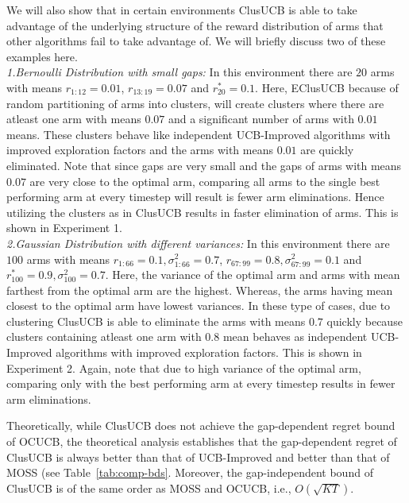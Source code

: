 We will also show that in certain environments ClusUCB is able to take advantage of the underlying structure of the reward distribution of arms that other algorithms fail to take advantage of. We will briefly discuss two of these examples here.
\\
\textit{1.Bernoulli Distribution with small gaps:} In this environment there are $20$ arms with means $r_{1:12}=0.01$, $r_{13:19}=0.07$ and $r_{20}^{*} =0.1$. Here, EClusUCB because of random partitioning of arms into clusters, will create clusters where there are atleast one arm with means $0.07$ and a significant number of arms with $0.01$ means. These clusters behave like independent UCB-Improved algorithms with improved exploration factors and the arms with means $0.01$ are quickly eliminated. Note that since gaps are very small and the gaps of arms with means $0.07$ are very close to the optimal arm, comparing all arms to the single best performing arm at every timestep will result is fewer arm eliminations. Hence utilizing the clusters as in ClusUCB results in faster elimination of arms. This is shown in Experiment 1.\\
\textit{2.Gaussian Distribution with different variances:} In this environment there are $100$ arms with means $r_{1:66}=0.1,\sigma_{1:66}^2 =0.7$, $r_{67:99}=0.8,\sigma_{67:99}^2 =0.1$ and $r_{100}^{*}=0.9, \sigma_{100}^2 =0.7$. Here, the variance of the optimal arm and arms with mean farthest from  the optimal arm are the highest. Whereas, the arms having mean closest to the optimal arm have lowest variances. In these type of cases, due to clustering ClusUCB is able to eliminate the arms with means $0.7$ quickly because clusters containing atleast one arm with $0.8$ mean behaves as independent UCB-Improved algorithms with improved exploration factors. This is shown in Experiment 2. Again, note that due to high variance of the optimal arm, comparing only with the best performing arm at every timestep results in fewer arm eliminations.

Theoretically, while ClusUCB does not achieve the gap-dependent regret bound of OCUCB, the theoretical analysis establishes that the gap-dependent regret of ClusUCB is always better than that of UCB-Improved and better than that of MOSS (see Table~\ref{tab:comp-bds}. Moreover, the gap-independent bound of ClusUCB is of the same order as MOSS and OCUCB, i.e., $O\left(\sqrt{KT}\right)$. 


